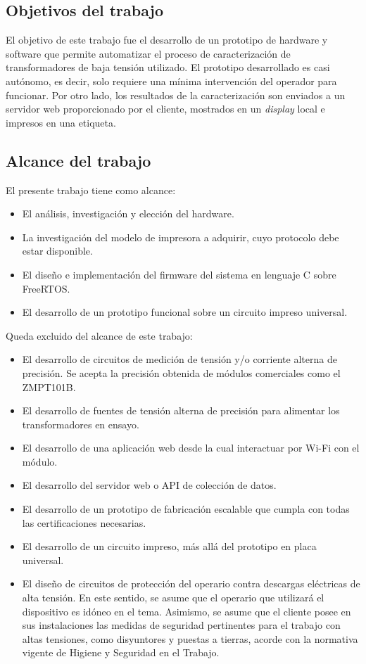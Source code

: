 \subsection{Objetivos del trabajo}

El objetivo de este trabajo fue el desarrollo de un prototipo de hardware y software que permite automatizar el proceso de caracterización de transformadores de baja tensión utilizado. El prototipo desarrollado es casi autónomo, es decir, solo requiere una mínima intervención del operador para funcionar. Por otro lado, los resultados de la caracterización son enviados a un servidor web proporcionado por el cliente, mostrados en un \textit{display} local e impresos en una etiqueta.

\subsection{Alcance del trabajo}
El presente trabajo tiene como alcance:
\begin{itemize}
\item El análisis, investigación y elección del hardware.
\item La investigación del modelo de impresora a adquirir, cuyo protocolo debe estar disponible.
\item El diseño e implementación del firmware del sistema en lenguaje C sobre FreeRTOS.
\item El desarrollo de un prototipo funcional sobre un circuito impreso universal.
\end{itemize}

Queda excluido del alcance de este trabajo:
\begin{itemize}
\item El desarrollo de circuitos de medición de tensión y/o corriente alterna de precisión. Se acepta la precisión obtenida de módulos comerciales como el ZMPT101B.
\item El desarrollo de fuentes de tensión alterna de precisión para alimentar los transformadores en ensayo.
\item El desarrollo de una aplicación web desde la cual interactuar por Wi-Fi con el módulo.
\item El desarrollo del servidor web o API de colección de datos.
\item El desarrollo de un prototipo de fabricación escalable que cumpla con todas las certificaciones necesarias.
\item El desarrollo de un circuito impreso, más allá del prototipo en placa universal.
\item El diseño de circuitos de protección del operario contra descargas eléctricas de alta tensión. En este sentido, se asume que el operario que utilizará el dispositivo es idóneo en el tema. Asimismo, se asume que el cliente posee en sus instalaciones las medidas de seguridad pertinentes para el trabajo con altas tensiones, como disyuntores y puestas a tierras, acorde con la normativa vigente de Higiene y Seguridad en el Trabajo.
\end{itemize}

